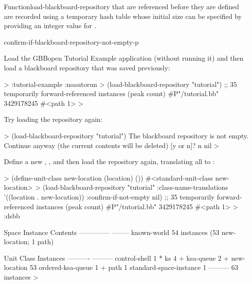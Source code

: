 \documentclass[10pt,twoside,english,pdftex]{article}
\begin{document}
\begin{functiondoc}{Function}{load-blackboard-repository}
 that are referenced before they are defined are
recorded using a temporary hash table whose initial size can be specified by
providing an integer value for .

\begin{alsos}{confirm-if-blackboard-repository-not-empty-p}
\end{alsos}

\fnexamples Load the GBBopen Tutorial Example application (without running it)
and then load a blackboard repository that was saved previously:
%
\W\supp
\begin{example}
  > :tutorial-example :noautorun 
  > (load-blackboard-repository "tutorial")
  ;; 35 temporarily forward-referenced instances (peak count)
  #P"/tutorial.bb"
  3429178245
  #<path 1>
  >
\end{example}
%
Try loading the repository again:
%
\W\supp\notpretop
\begin{example}
  > (load-blackboard-repository "tutorial")
  The blackboard repository is not empty.
  Continue anyway (the current contents will be deleted) [y or n]? n
  nil
  >
\end{example}
%
Define a new , , and then load the
repository again, translating all 
 to  :
%
\W\supp\notpretop
\begin{example}
  > (define-unit-class new-location (location) ())
  #<standard-unit-class new-location>
  > (load-blackboard-repository "tutorial"
      :class-name-translations '((location . new-location))
      :confirm-if-not-empty nil)
  ;; 35 temporarily forward-referenced instances (peak count)
  #P"/tutorial.bb"
  3429178245
  #<path 1>
  > :dsbb

  Space Instance                Contents
  --------------                --------
  known-world                   54 instances (53 new-location; 1 path)

  Unit Class                    Instances
  ----------                    ---------
  control-shell                         1 *
  ks                                    4 +
  ksa-queue                             2 +
  new-location                         53  
  ordered-ksa-queue                     1 +
  path                                  1  
  standard-space-instance               1  
                                ---------
                                       63 instances
  >
\end{example}

\end{functiondoc}
\end{document}

